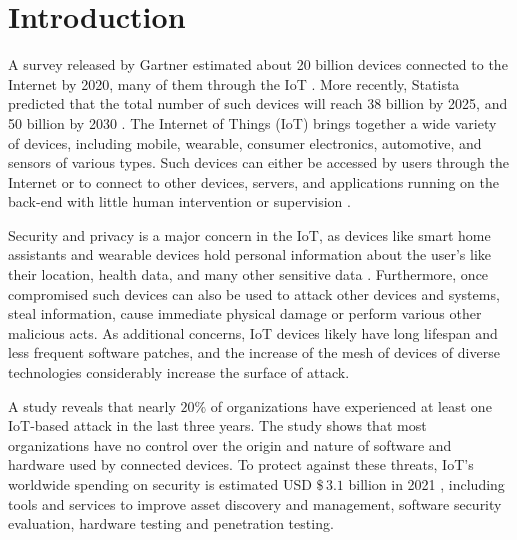 

\section{Introduction}

\newcommand{\refminas}{\textit{Ref}\xspace}
\newcommand{\mfog}{\textit{MFOG}\xspace}
\newcommand{\iot}{IoT\xspace}
\newcommand{\nids}{NIDS\xspace}
\newcommand{\ds}{DS\xspace}

A survey released by Gartner estimated about 20 billion devices connected to the
Internet by 2020, many of them through the IoT \cite{gartner_forecast_2017}.
More recently, Statista predicted that the total number of such devices will
reach 38 billion by 2025, and 50 billion by 2030 \cite{statista-iot}.
The Internet of Things (IoT) brings together a wide variety of devices,
including mobile, wearable, consumer electronics, automotive, and sensors of
various types.
Such devices can either be accessed by users through the Internet or to connect
to other devices, servers, and applications running on the back-end
with little human intervention or supervision
\cite{Tahsien2020,abane2019,haddadpajouh2019survey,Shanbhag2015}.

Security and privacy is a major concern in the IoT, as devices like smart home
assistants and wearable devices hold personal information about the user’s like
their location, health data, and many other sensitive data
\cite{sengupta2020comprehensive}.
Furthermore, once compromised such devices can also be used to attack other
devices and systems, steal information, cause immediate physical damage or
perform various other malicious acts.
As additional concerns, IoT devices likely have long lifespan and less frequent
software patches, and the increase of the mesh of devices of diverse
technologies considerably increase the surface of attack.

A study reveals that nearly $20\%$ of organizations have experienced at least one
IoT-based attack in the last three years.
The study shows that most organizations have no control over the origin and
nature of software and hardware used by connected devices.
To protect against these threats, IoT's worldwide spending on security is
estimated USD $\$\,3.1$ billion in 2021 \cite{gartner_it_glossary_2018}, including tools
and services to improve asset discovery and management, software security
evaluation, hardware testing and penetration testing.

